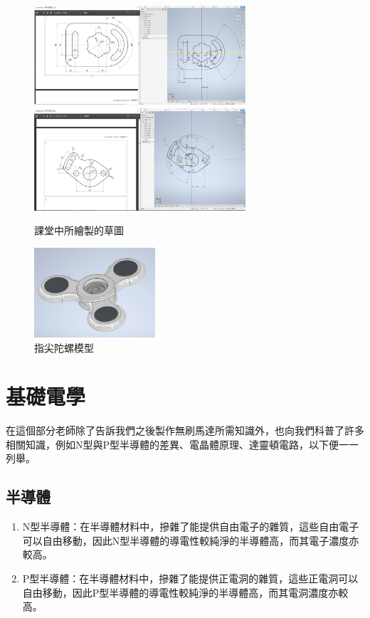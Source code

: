 \documentclass[12pt,a4paper]{article}
\begin{document}
\begin{CJK*}{UTF8}{bkai}
    \begin{figure}[h]
        \centering
        \includegraphics[width=0.7\textwidth]{./images/course_cad_draft1.png}
        \includegraphics[width=0.7\textwidth]{./images/course_cad_draft2.png}
        \caption{課堂中所繪製的草圖}
        \label{fig:course_draft}
    \end{figure}
    \begin{figure}[h]
        \centering
        \includegraphics[width=0.4\textwidth]{./images/fidget_spinnner.png}
        \caption{指尖陀螺模型}
        \label{fig:figet_spinnner}
    \end{figure}

    \newpage

    \section{基礎電學}

    在這個部分老師除了告訴我們之後製作無刷馬達所需知識外，也向我們科普了許多相關知識，例如N型與P型半導體的差異、電晶體原理、達靈頓電路，以下便一一列舉。

    \subsection{半導體}
    \begin{enumerate}
        \item N型半導體：在半導體材料中，摻雜了能提供自由電子的雜質，這些自由電子可以自由移動，因此N型半導體的導電性較純淨的半導體高，而其電子濃度亦較高。
        \item P型半導體：在半導體材料中，摻雜了能提供正電洞的雜質，這些正電洞可以自由移動，因此P型半導體的導電性較純淨的半導體高，而其電洞濃度亦較高。
    \end{enumerate}


\end{CJK*}
\end{document}
